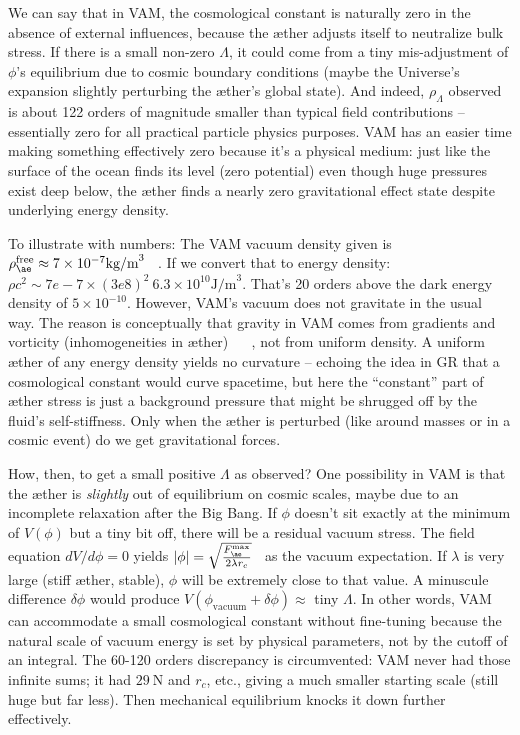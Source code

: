 \documentclass[a4paper, aps,preprint,superscriptaddress, 12pt]{revtex4}
\begin{document}
We can say that in VAM, the cosmological constant is naturally zero in the absence of external influences, because the æther adjusts itself to neutralize bulk stress. If there is a small non-zero $\Lambda$, it could come from a tiny mis-adjustment of $\phi$’s equilibrium due to cosmic boundary conditions (maybe the Universe’s expansion slightly perturbing the æther’s global state). And indeed, $\rho_\Lambda$ observed is about 122 orders of magnitude smaller than typical field contributions – essentially zero for all practical particle physics purposes. VAM has an easier time making something effectively zero because it’s a physical medium: just like the surface of the ocean finds its level (zero potential) even though huge pressures exist deep below, the æther finds a nearly zero gravitational effect state despite underlying energy density.


To illustrate with numbers: The VAM vacuum density given is $\rho_{\ae}^{\text{free}}\approx7\times10^{-7}\text{kg/m}^3$~\cite{VAM_constants} . If we convert that to energy density: $\rho c^2 \sim 7e-7 \times (3e8)^2 ~ 6.3\times10^{10}\text{J/m}^3$. That’s 20 orders above the dark energy density of $5\times10^{-10}$. However, VAM’s vacuum does not gravitate in the usual way. The reason is conceptually that gravity in VAM comes from gradients and vorticity (inhomogeneities in æther)~\cite{Iskandarani2025c} ~\cite{Iskandarani2025c} , not from uniform density. A uniform æther of any energy density yields no curvature – echoing the idea in GR that a cosmological constant would curve spacetime, but here the “constant” part of æther stress is just a background pressure that might be shrugged off by the fluid’s self-stiffness. Only when the æther is perturbed (like around masses or in a cosmic event) do we get gravitational forces.


How, then, to get a small positive $\Lambda$ as observed? One possibility in VAM is that the æther is \textit{slightly} out of equilibrium on cosmic scales, maybe due to an incomplete relaxation after the Big Bang. If $\phi$ doesn’t sit exactly at the minimum of $V(\phi)$ but a tiny bit off, there will be a residual vacuum stress. The field equation $dV/d\phi = 0$ yields $|\phi| = \sqrt{\frac{F_{\ae}^{\max}}{2\lambda r_c}}$~\cite{Iskandarani2025c}  as the vacuum expectation. If $\lambda$ is very large (stiff æther, stable), $\phi$ will be extremely close to that value. A minuscule difference $\delta\phi$ would produce $V(\phi_{\text{vacuum}}+\delta\phi) \approx$ tiny $\Lambda$. In other words, VAM can accommodate a small cosmological constant without fine-tuning because the natural scale of vacuum energy is set by physical parameters, not by the cutoff of an integral. The 60-120 orders discrepancy is circumvented: VAM never had those infinite sums; it had $29~\text{N}$ and $r_c$, etc., giving a much smaller starting scale (still huge but far less). Then mechanical equilibrium knocks it down further effectively.
\end{document}
